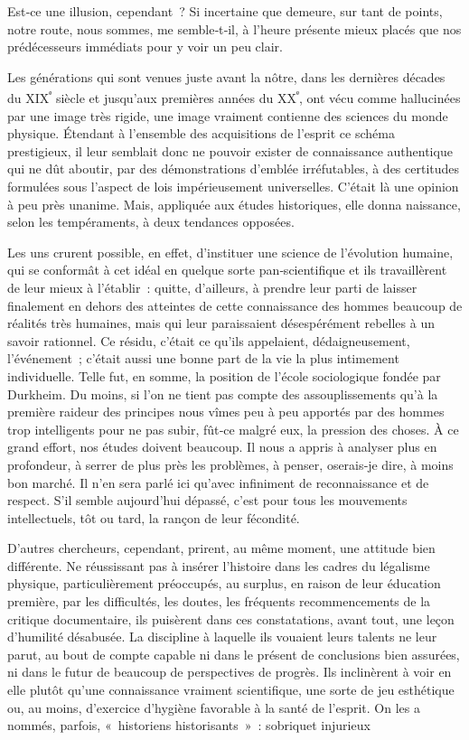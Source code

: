 \documentclass[french,twoside]{book} %
\begin{document}
\noindent  {}
\label{pXV} Est‑ce une illusion, cependant ? Si incertaine que demeure, sur tant de points, notre route, nous sommes, me semble‑t‑il, à l’heure présente mieux placés que nos prédécesseurs immédiats pour y voir un peu clair.\par
Les générations qui sont venues juste avant la nôtre, dans les dernières décades du XIX\textsuperscript{ᵉ} siècle et jusqu’aux premières années du XX\textsuperscript{ᵉ}, ont vécu comme hallucinées par une image très rigide, une image vraiment contienne des sciences du monde physique. Étendant à l’ensemble des acquisitions de l’esprit ce schéma prestigieux, il leur semblait donc ne pouvoir exister de connaissance authentique qui ne dût aboutir, par des démonstrations d’emblée irréfutables, à des certitudes formulées sous l’aspect de lois impérieusement universelles. C’était là une opinion à peu près unanime. Mais, appliquée aux études historiques, elle donna nais­sance, selon les tempéraments, à deux tendances opposées.\par
Les uns crurent possible, en effet, d’instituer une science de l’évolution humaine, qui se conformât à cet idéal en quelque sorte pan‑scientifique et ils travaillèrent de leur mieux à l’établir : quitte, d’ailleurs, à prendre leur parti de laisser finalement en dehors des atteintes de cette connais­sance des hommes beaucoup de réalités très humaines, mais qui leur paraissaient désespérément rebelles à un savoir rationnel. Ce résidu, c’était ce qu’ils appelaient, dédaigneusement, l’événement ; c’était aussi une bonne part de la vie la plus intimement individuelle. Telle fut, en somme, la position de l’école sociologique fondée par Durkheim. Du moins, si l’on ne tient pas compte des assouplissements qu’à la première raideur des principes nous vîmes peu à peu apportés par des hommes trop intel­ligents pour ne pas subir, fût‑ce malgré eux, la pression des choses. À ce grand effort, nos études doivent beaucoup. Il nous a appris à analyser plus en profondeur, à serrer de plus près les problèmes, à penser, oserais‑je dire, à moins bon marché. Il n’en sera parlé ici qu’avec infiniment de reconnaissance et de respect. S’il semble aujourd’hui dépassé, c’est pour tous les mouvements intellectuels, tôt ou tard, la rançon de leur fécondité.\par
D’autres chercheurs, cependant, prirent, au même moment, une attitude bien différente. Ne réussissant pas à insérer l’histoire dans les cadres du légalisme physique, particulièrement préoccupés, au surplus, en raison de leur éducation première, par les difficultés, les doutes, les fréquents recommencements de la critique documentaire, ils puisèrent dans ces constatations, avant tout, une leçon d’humilité désabusée. La discipline à laquelle ils vouaient leurs talents ne leur parut, au bout de compte capable ni dans le présent de conclusions bien assurées, ni dans le futur de beaucoup de perspectives de progrès. Ils inclinèrent à voir en elle plutôt qu’une connaissance vraiment scientifique, une sorte de jeu esthétique ou, au moins, d’exercice d’hygiène favorable à la santé de l’esprit. On les a nommés, parfois, « historiens historisants » : sobriquet injurieux  
\end{document}
